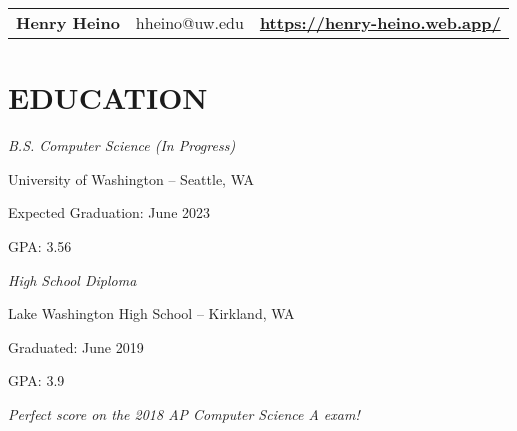 \documentclass[12pt,letterpaper]{extarticle}
\begin{document}
  \setlength\parindent{0em}
  \begin{tabular}{lcr}
    {\huge \textbf{Henry Heino}} & hheino@uw.edu & {\large \textbf{\url{https://henry-heino.web.app/}}}
  \end{tabular}
  \section{EDUCATION}
  \emph{B.S. Computer Science (In Progress)}
  \begin{addmargin}[2em]{0em}
    \par University of Washington -- Seattle, WA
    \par Expected Graduation: June 2023
    \par GPA: 3.56
  \end{addmargin}

  \emph{High School Diploma}
  \begin{addmargin}[2em]{0em}
    \par Lake Washington High School -- Kirkland, WA
    \par Graduated: June 2019
    \par GPA: 3.9
    \par \emph{\footnotesize{Perfect score on the 2018 AP Computer Science A exam!}}
  \end{addmargin}
\end{document}
